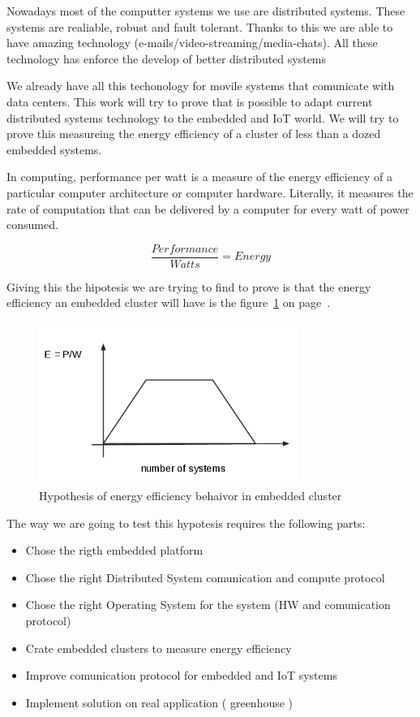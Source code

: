 Nowadays most of the computter systems we use are distributed systems. These
systems are realiable, robust and fault tolerant. Thanks to this we are able to
have amazing technology (e-mails/video-streaming/media-chats). All these
technology has enforce the develop of better distributed systems

We already have all this techonology for movile systems that comunicate with
data centers. This work will try to prove that is possible to adapt current
distributed systems technology to the embedded and IoT world. We will try to
prove this measureing the energy efficiency of a cluster of less than a dozed 
embedded systems. 

In computing, performance per watt is a measure of the energy efficiency of a
particular computer architecture or computer hardware. Literally, it measures
the rate of computation that can be delivered by a computer for every watt of
power consumed. 



\begin{equation}
    \dfrac {Performance}{Watts} = Energy
\end{equation}

Giving this the hipotesis we are trying to find to prove is that the energy
efficiency an embedded cluster will have is the 
figure~\ref{fig:1.2} on page~\pageref{fig:1.2}.


\begin{figure}[H]
\centering
\includegraphics[width=0.75\textwidth]{images/graph_1.png}
\caption{Hypothesis of energy efficiency behaivor in embedded cluster}
\label{fig:1.2}
\end{figure}

The way we are going to test this hypotesis requires the following parts:


\begin{itemize}
\item Chose the rigth embedded platform 
\item Chose the right Distributed System comunication and compute protocol
\item Chose the right Operating System for the system (HW and comunication protocol) 
\item Crate embedded clusters to measure energy efficiency
\item Improve comunication protocol for embedded and IoT systems
\item Implement solution on real application ( greenhouse )
\end{itemize}

